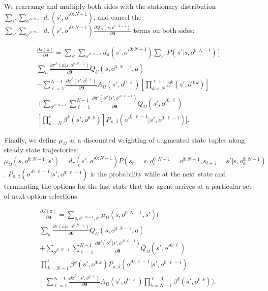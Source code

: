 \documentclass[letterpaper]{article} %
\begin{document}
We rearrange and multiply both sides with the stationary distribution $\sum_{s'} \sum_{o'^{0:N-1}}  d_\pi(s',o'^{0:N-1}) $, and cancel the $\sum_{s'} \sum_{o'^{0:N-1}}  d_\pi(s',o'^{0:N-1}) \frac{\partial Q_\Omega(s,o^{0:N-1})}{\partial \bm{\theta}}$ terms on both sides:

\begin{equation}
\begin{split}
\frac{\partial J(\pi)}{\partial \bm{\theta}}
=\sum_{s'} \sum_{o'^{0:N-1}}  d_\pi(s',o'^{0:N-1}) 
\sum_{s'} P(s'|s,o^{0:N-1}) \bigg[ \\
\sum_{a} \frac{ \partial \pi^N(a|s,o^{0:N-1})}{\partial \bm{\theta}} Q_U(s,o^{0:N-1},a)\\
- \sum_{\ell=1}^{N-1} \frac{\partial \beta^\ell(s',o^{0:\ell})}{\partial \bm{\theta}} A_\Omega(s',o^{0:\ell}) [ \prod_{k=N}^{\ell+1} \beta^k(s',o^{0:k}) ] \\
+   \sum_{o'^{0:N-1}} \sum_{\ell=1}^{N-1} \frac{\partial \pi^\ell(o'^\ell|s',o'^{0:\ell-1})}{\partial \bm{\theta}} Q_\Omega(s',o'^{0:\ell}) \\
[\prod_{k=N}^{\ell} \beta^k(s',o^{0:k}) ]  P_{\pi,\beta}(o'^{0:\ell-1}|s',o^{0:\ell-1})
\bigg].
\end{split}
\end{equation}

Finally, we define $\mu_\Omega$ as a discounted weighting of augmented state tuples along steady state trajectories: $\mu_\Omega(s,o^{0:N-1},s') = d_\pi(s',o'^{0:N-1})  P(s_t=s, o_t^{0:N-1}=o^{0:N-1},s_{t+1}=s'|s,o_0^{0:N-1})$. $P_{\pi,\beta}(o'^{0:\ell-1}|s',o^{0:\ell-1})$ is the probability while at the next state and terminating the options for the last state that the agent arrives at a particular set of next option selections.

\begin{equation}
\begin{split}
\frac{\partial J(\pi)}{\partial \bm{\theta}} 
=\sum_{s,o^{0:N-1},s'}  \mu_\Omega(s,o^{0:N-1},s')  \bigg(\\
\sum_{a} \frac{\partial \pi(a|s,o^{0:N-1})}{\partial \bm{\theta}} Q_U(s,o^{0:N-1},a) \\ 
+ \sum_{o'^{0:N-1}} \sum_{\ell=1}^{N-1} \frac{\partial \pi^\ell(o'^\ell|s',o'^{0:\ell-1}) }{\partial \bm{\theta}} Q_\Omega(s',o'^{0:\ell})\\
\prod_{k=N-1}^{\ell} \beta^k(s',o^{0:k})  P_{\pi,\beta}(o'^{0:\ell-1}|s',o^{0:\ell-1}) \\
- \sum_{\ell=1}^{N-1} \frac{\partial \beta^\ell(s',o^{0:\ell})}{\partial \bm{\theta}} A_\Omega(s',o^{0:\ell}) \prod_{k=N-1}^{\ell+1} \beta^k(s',o^{0:k}) \bigg).
\end{split}
\end{equation}
\end{document}
